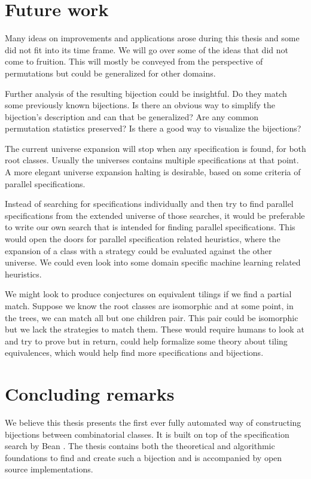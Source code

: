 \label{ch:conclusion}

\section{Future work}\label{s:fw}
Many ideas on improvements and applications arose during this thesis and some did not fit into its time frame. We will go over some of the ideas that did not come to fruition. This will mostly be conveyed from the perspective of permutations but could be generalized for other domains.

Further analysis of the resulting bijection could be insightful. Do they match some previously known bijections. Is there an obvious way to simplify the bijection's description and can that be generalized? Are any common permutation statistics preserved? Is there a good way to visualize the bijections?

The current universe expansion will stop when any specification is found, for both root classes. Usually the universes contains multiple specifications at that point. A more elegant universe expansion halting is desirable, based on some criteria of parallel specifications.

Instead of searching for specifications individually and then try to find parallel specifications from the extended universe of those searches, it would be preferable to write our own search that is intended for finding parallel specifications. This would open the doors for parallel specification related heuristics, where the expansion of a class with a strategy could be evaluated against the other universe. We could even look into some domain specific machine learning related heuristics. 

We might look to produce conjectures on equivalent tilings if we find a partial match. Suppose we know the root classes are isomorphic and at some point, in the trees, we can match all but one children pair. This pair could be isomorphic but we lack the strategies to match them. These would require humans to look at and try to prove but in return, could help formalize some theory about tiling equivalences, which would help find more specifications and bijections.

\section{Concluding remarks}
We believe this thesis presents the first ever fully automated way of constructing bijections between combinatorial classes. It is built on top of the specification search by Bean \cite{BeanPhd:phd}. The thesis contains both the theoretical and algorithmic foundations to find and create such a bijection and is accompanied by open source implementations.

